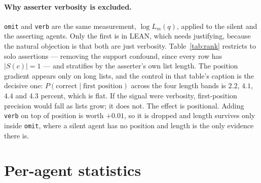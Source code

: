 \documentclass[11pt]{article}
\begin{document}
\paragraph{Why asserter verbosity is excluded.}
\texttt{omit} and \texttt{verb} are the same measurement, $\log L_m(q)$, applied to the silent and the asserting agents. Only the first is in LEAN, which needs justifying, because the natural objection is that both are just verbosity. Table~\ref{tab:rank} restricts to solo assertions --- removing the support confound, since every row has $|S(c)|=1$ --- and stratifies by the asserter's own list length. The position gradient appears only on long lists, and the control in that table's caption is the decisive one: $P(\mathrm{correct} \mid \text{first position})$ across the four length bands is $2.2$, $4.1$, $4.4$ and $4.3$ percent, which is flat. If the signal were verbosity, first-position precision would fall as lists grow; it does not. The effect is positional. Adding \texttt{verb} on top of position is worth $+0.01$, so it is dropped and length survives only inside \texttt{omit}, where a silent agent has no position and length is the only evidence there is.

\section{Per-agent statistics}
\label{app:agents}
\end{document}
